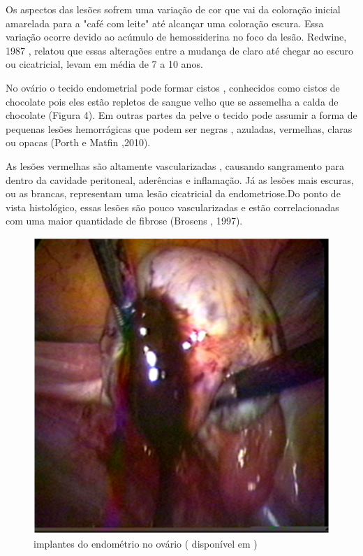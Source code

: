 \documentclass[12pt]{article} %
\begin{document}
Os aspectos das lesões sofrem uma variação de cor que vai da coloração inicial amarelada para a  "café com leite" até alcançar uma coloração escura. Essa variação ocorre devido ao acúmulo de hemossiderina no foco da lesão. Redwine, 1987 , relatou que essas alterações entre a mudança de claro até chegar ao escuro ou cicatricial, levam em média de 7 a 10 anos.

No ovário o tecido endometrial pode formar cistos , conhecidos como cistos de chocolate pois eles estão repletos de sangue velho que se assemelha a calda de chocolate (Figura 4). Em outras partes da pelve o tecido pode assumir a forma de pequenas lesões hemorrágicas que podem ser negras , azuladas, vermelhas, claras ou opacas (Porth e Matfin ,2010).

As lesões vermelhas são altamente vascularizadas , causando sangramento para dentro da cavidade peritoneal, aderências e inflamação. Já as lesões mais escuras, ou as brancas, representam uma lesão cicatricial da endometriose.Do ponto de vista histológico, essas lesões são pouco vascularizadas e estão correlacionadas com uma maior quantidade de fibrose (Brosens , 1997).

\begin{figure}[h!] 
\includegraphics[width=16cm]{endometriomaroto.jpg}
\caption[Endometriose: implantes do endométrio no ovário] {implantes do endométrio no ovário ( disponível em )}
\end{figure} 
\end{document}

